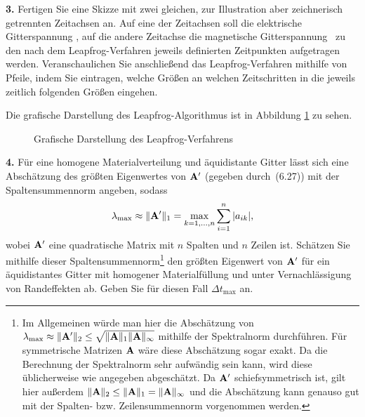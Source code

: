 \documentclass[Protokollheft.tex]{subfiles}
\begin{document}
\begin{framed}
	\noindent \textbf{3.} Fertigen Sie eine Skizze mit zwei gleichen, zur Illustration aber zeichnerisch getrennten Zeitachsen an. Auf eine der Zeitachsen soll die elektrische Gitterspannung \efit, auf die andere Zeitachse die magnetische Gitterspannung \hfit\ zu den nach dem Leapfrog-Verfahren jeweils definierten Zeitpunkten aufgetragen werden. Veranschaulichen Sie anschließend das Leapfrog-Verfahren mithilfe von Pfeile, indem Sie eintragen, welche Größen an welchen Zeitschritten in die jeweils zeitlich folgenden Größen eingehen.\label{exer:LeapfrogOnTimeAxes}
\end{framed}
\noindent
Die grafische Darstellung des Leapfrog-Algorithmus ist in Abbildung \ref{fig:zeitachse} zu sehen.
\begin{figure}[h]
	\centering
	\def\svgwidth{0.7\textwidth}
	
	\caption{Grafische Darstellung des Leapfrog-Verfahrens}
	\label{fig:zeitachse}
\end{figure}

\begin{framed}
	\noindent \textbf{4.} Für eine homogene Materialverteilung und äquidistante Gitter
    lässt sich eine Abschätzung des größten Eigenwertes von $ \mathbf{A} '$ (gegeben durch~(6.27)) mit der Spaltensummennorm angeben, sodass~
    \begin{align}
        \lambda_{\text{max}} \approx\| \mathbf{A} '\|_1=\max_{k=1,\ldots,n} \sum_{i=1}^n |a_{ik}|,
    \end{align}
    wobei $ \mathbf{A} '$ eine quadratische Matrix mit $n$ Spalten und $n$ Zeilen
    ist. Schätzen Sie mithilfe dieser Spaltensummennorm\footnote{Im Allgemeinen würde man hier die Abschätzung von $\lambda_{\text{max}}\approx\| \mathbf{A} '\|_2\le\sqrt{\| \mathbf{A} \|_1\| \mathbf{A} \|_\infty}$ mithilfe der Spektralnorm durchführen. Für symmetrische Matrizen $ \mathbf{A} $ wäre diese Abschätzung sogar exakt. Da die Berechnung der Spektralnorm sehr aufwändig sein kann, wird diese üblicherweise wie angegeben abgeschätzt. Da $ \mathbf{A} '$ schiefsymmetrisch ist, gilt hier außerdem ${\| \mathbf{A} \|_2\le\| \mathbf{A} \|_1=\| \mathbf{A} \|_\infty}$ und die Abschätzung kann genauso gut mit der Spalten- bzw. Zeilensummennorm vorgenommen werden.}
    den größten Eigenwert von $ \mathbf{A} '$ für ein äquidistantes Gitter mit
    homogener Materialfüllung und unter Vernachlässigung von Randeffekten ab. Geben Sie für diesen Fall $\Delta t_{\text{max}}$ an.\label{exer:approxEVofAprime}
\end{framed}
\end{document}

